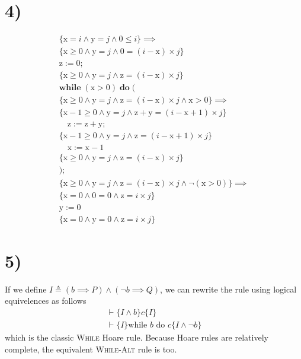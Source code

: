 \documentclass[11pt]{article}
\newcommand{\infrule}[2]{%
  \begin{array}{c}
    #1 \\ \hline #2
  \end{array}%
}
\begin{document}
\section*{4)}
\[
\begin{array}{l}
\{ \mathrm{x} = i \land \mathrm{y} = j \land 0 \le i \} \implies \\
\{ \mathrm{x} \geq 0 \land \mathrm{y} = j \land 0 = (i-\mathrm{x}) \times j \}\\
\mathrm{z} := 0; \\
  \{ \mathrm{x} \geq 0 \land \mathrm{y} = j \land \mathrm{z} = (i-\mathrm{x}) \times j \}\\
\mathbf{while} \; (\mathrm{x} > 0) \; \mathbf{do} \; ( \\
  \{ \mathrm{x} \geq 0 \land \mathrm{y} = j \land \mathrm{z} = (i-\mathrm{x}) \times j \land \mathrm{x} > 0 \} \implies\\
  \{ \mathrm{x} - 1 \geq 0 \land \mathrm{y} = j \land \mathrm{z} + \mathrm{y} = (i-\mathrm{x} + 1) \times j \}\\
\quad \mathrm{z} := \mathrm{z} + \mathrm{y}; \\
  \{ \mathrm{x} - 1 \geq 0 \land \mathrm{y} = j \land \mathrm{z} = (i-\mathrm{x} + 1) \times j \}\\
\quad \mathrm{x} := \mathrm{x} - 1 \\
  \{ \mathrm{x} \geq 0 \land \mathrm{y} = j \land \mathrm{z} = (i-\mathrm{x}) \times j\}\\
); \\
  \{\mathrm{x} \geq 0 \land \mathrm{y} = j \land \mathrm{z} = (i-\mathrm{x}) \times j \land \lnot (\mathrm{x} > 0)\} \implies \\
\{ \mathrm{x} = 0 \land 0 = 0 \land \mathrm{z} = i \times j \}\\
\mathrm{y} := 0 \\
\{ \mathrm{x} = 0 \land \mathrm{y} = 0 \land \mathrm{z} = i \times j \}
\end{array}
\]
\section*{5)}
If we define $ I \triangleq (b \implies P) \land (\lnot b \implies Q) $, we can rewrite the rule using logical equivelences as follows
\[
  \infrule{\vdash \{I \land b\} c \{I\}}{\vdash \{I\} \text{while } b \text{ do } c \{I \land \lnot b\} }
\]
which is the classic \textsc{While} Hoare rule. Because Hoare rules are relatively complete, the equivalent \textsc{While-Alt} rule is too.
\end{document}
